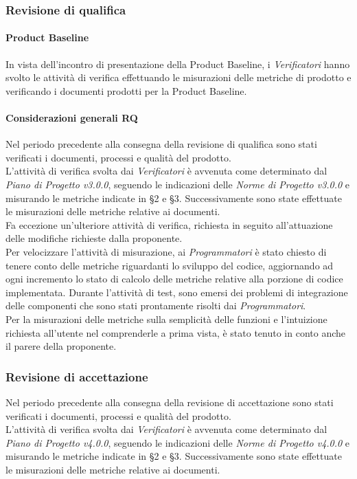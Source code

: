 	\subsubsection{Revisione di qualifica}
	\paragraph{Product Baseline}
	In vista dell'incontro di presentazione della Product Baseline\glo, i \textit{Verificatori} hanno svolto le attività di verifica effettuando le misurazioni delle metriche di prodotto e verificando i documenti prodotti per la Product Baseline.
	
			
	\paragraph{Considerazioni generali RQ}
	Nel periodo precedente alla consegna della revisione di qualifica sono stati verificati i documenti, processi e qualità del prodotto. \\
	L'attività di verifica svolta dai \textit{Verificatori} è avvenuta come determinato dal \textit{Piano di Progetto v3.0.0}, seguendo le indicazioni delle \textit{Norme di Progetto v3.0.0} e misurando le metriche indicate in §2 e §3.  Successivamente sono state effettuate le misurazioni delle metriche relative ai documenti. \\
	Fa eccezione un'ulteriore attività di verifica, richiesta in seguito all'attuazione delle modifiche richieste dalla proponente. \\
	Per velocizzare l'attività di misurazione, ai \textit{Programmatori} è stato chiesto di tenere conto delle metriche riguardanti lo sviluppo del codice, aggiornando ad ogni incremento lo stato di calcolo delle metriche relative alla porzione di codice implementata.
	Durante l'attività di test, sono emersi dei problemi di integrazione delle componenti che sono stati prontamente risolti dai \textit{Programmatori}. \\
	Per la misurazioni delle metriche sulla semplicità delle funzioni e l'intuizione richiesta all'utente nel comprenderle a prima vista, è  stato tenuto in conto anche il parere della proponente. 
	\newpage
	\subsubsection{Revisione di accettazione}
	Nel periodo precedente alla consegna della revisione di accettazione sono stati verificati i documenti, processi e qualità del prodotto. \\
	L'attività di verifica svolta dai \textit{Verificatori} è avvenuta come determinato dal \textit{Piano di Progetto v4.0.0}, seguendo le indicazioni delle \textit{Norme di Progetto v4.0.0} e misurando le metriche indicate in §2 e §3. Successivamente sono state effettuate le misurazioni delle metriche relative ai documenti. 
